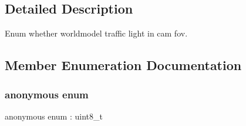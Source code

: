 \subsection{Detailed Description}
Enum whether worldmodel traffic light in cam fov. 

\subsection{Member Enumeration Documentation}
\mbox{\label{structmaf__perception__interface_1_1TrafficLightInFov_ad3563dadfa7d3fbbf16b4de858983efd}} 
\subsubsection{\texorpdfstring{anonymous enum}{anonymous enum}}
{\footnotesize\ttfamily anonymous enum \+: uint8\+\_\+t}

